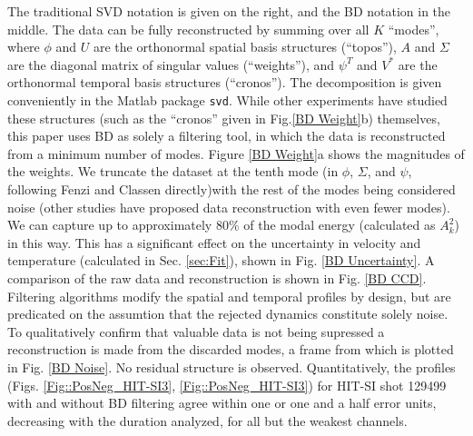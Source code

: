 	The traditional SVD notation is given on the right, and the BD notation in the middle. The data can be fully reconstructed by summing over all $K$ ``modes'', where $\phi$ and $U$ are the orthonormal spatial basis structures (``topos''), $A$ and $\Sigma$ are the diagonal matrix of singular values (``weights''), and $\psi^T$ and $V^*$ are the orthonormal temporal basis structures (``cronos''). The decomposition is given conveniently in the Matlab package \texttt{svd}. While other experiments have studied these structures (such as the ``cronos'' given in Fig.\ref{BD Weight}b) themselves\cite{fenzi20012d}, this paper uses BD as solely a filtering tool, in which the data is reconstructed from a minimum number of modes. Figure \ref{BD Weight}a shows the magnitudes of the weights. We truncate the dataset at the tenth mode (in $\phi$, $\Sigma$, and $\psi$, following Fenzi\cite{fenzi20012d} and Classen\cite{Classen2010} directly)with the rest of the modes being considered noise (other studies have proposed data reconstruction with even fewer modes\cite{gavish2014optimal}). We can capture up to approximately $80\%$ of the modal energy (calculated as $A_k^2$)\cite{de1994biorthogonal} in this way. This has a significant effect on the uncertainty in velocity and temperature (calculated in Sec. \ref{sec:Fit}), shown in Fig. \ref{BD Uncertainty}. A comparison of the raw data and reconstruction is shown in Fig. \ref{BD CCD}. Filtering algorithms modify the spatial and temporal profiles by design, but are predicated on the assumtion that the rejected dynamics constitute solely noise. To qualitatively confirm that valuable data is not being supressed a reconstruction is made from the discarded modes, a frame from which is plotted in Fig. \ref{BD Noise}. No residual structure is observed. Quantitatively, the  profiles (Figs. \ref{Fig::PosNeg_HIT-SI3}, \ref{Fig::PosNeg_HIT-SI3}) for HIT-SI shot 129499 with and without BD filtering agree within one or one and a half error units, decreasing with the duration analyzed, for all but the weakest channels. 
